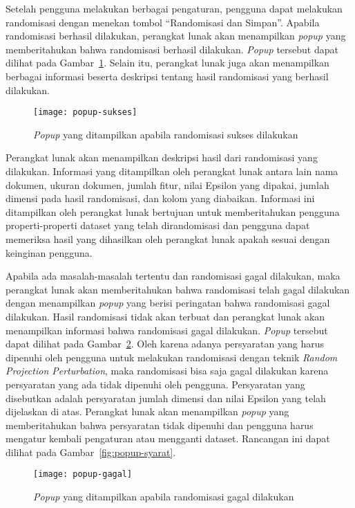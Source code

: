 Setelah pengguna melakukan berbagai pengaturan, pengguna dapat melakukan randomisasi dengan menekan tombol \textquotedblleft Randomisasi dan Simpan\textquotedblright. Apabila randomisasi berhasil dilakukan, perangkat lunak akan menampilkan \textit{popup} yang memberitahukan bahwa randomisasi berhasil dilakukan. \textit{Popup} tersebut dapat dilihat pada Gambar~\ref{fig:popup-sukses}. Selain itu, perangkat lunak juga akan menampilkan berbagai informasi beserta deskripsi tentang hasil randomisasi yang berhasil dilakukan.

\begin{figure}
	\centering
	\texttt{[image: popup-sukses]}
	\caption{\textit{Popup} yang ditampilkan apabila randomisasi sukses dilakukan}
	\label{fig:popup-sukses}
\end{figure}

Perangkat lunak akan menampilkan deskripsi hasil dari randomisasi yang dilakukan. Informasi yang ditampilkan oleh perangkat lunak antara lain nama dokumen, ukuran dokumen, jumlah fitur, nilai Epsilon yang dipakai, jumlah dimensi pada hasil randomisasi, dan kolom yang diabaikan. Informasi ini ditampilkan oleh perangkat lunak bertujuan untuk memberitahukan pengguna properti-properti dataset yang telah dirandomisasi dan pengguna dapat memeriksa hasil yang dihasilkan oleh perangkat lunak apakah sesuai dengan keinginan pengguna.

Apabila ada masalah-masalah tertentu dan randomisasi gagal dilakukan, maka perangkat lunak akan memberitahukan bahwa randomisasi telah gagal dilakukan dengan menampilkan \textit{popup} yang berisi peringatan bahwa randomisasi gagal dilakukan. Hasil randomisasi tidak akan terbuat dan perangkat lunak akan menampilkan informasi bahwa randomisasi gagal dilakukan. \textit{Popup} tersebut dapat dilihat pada Gambar~\ref{fig:popup-gagal}. Oleh karena adanya persyaratan yang harus dipenuhi oleh pengguna untuk melakukan randomisasi dengan teknik \textit{Random Projection Perturbation}, maka randomisasi bisa saja gagal dilakukan karena persyaratan yang ada tidak dipenuhi oleh pengguna. Persyaratan yang disebutkan adalah persyaratan jumlah dimensi dan nilai Epsilon yang telah dijelaskan di atas. Perangkat lunak akan menampilkan \textit{popup} yang memberitahukan bahwa persyaratan tidak dipenuhi dan pengguna harus mengatur kembali pengaturan atau mengganti dataset. Rancangan ini dapat dilihat pada Gambar~\ref{fig:popup-syarat}.

\begin{figure}
	\centering
	\texttt{[image: popup-gagal]}
	\caption{\textit{Popup} yang ditampilkan apabila randomisasi gagal dilakukan}
	\label{fig:popup-gagal}
\end{figure}

